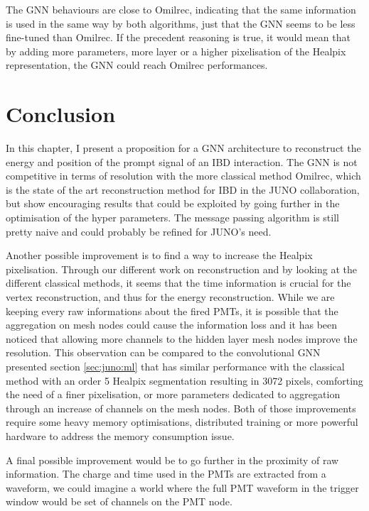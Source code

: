 \documentclass[../main.tex]{subfiles}
\begin{document}
The GNN behaviours are close to Omilrec, indicating that the same information is used in the same way by both algorithms, just that the GNN seems to be less fine-tuned than Omilrec. If the precedent reasoning is true, it would mean that by adding more parameters, more layer or a higher pixelisation of the Healpix representation, the GNN could reach Omilrec performances.



\section{Conclusion}


In this chapter, I present a proposition for a GNN architecture to reconstruct the energy and position of the prompt signal of an IBD interaction. The GNN is not competitive in terms of resolution with the more classical method Omilrec, which is the state of the art reconstruction method for IBD in the JUNO collaboration, but show encouraging results that could be exploited by going further in the optimisation of the hyper parameters. The message passing algorithm is still pretty naive and could probably be refined for JUNO's need.

Another possible improvement is to find a way to increase the Healpix pixelisation. Through our different work on reconstruction and by looking at the different classical methods, it seems that the time information is crucial for the vertex reconstruction, and thus for the energy reconstruction. While we are keeping every raw informations about the fired PMTs, it is possible that the aggregation on mesh nodes could cause the information loss and it has been noticed that allowing more channels to the hidden layer mesh nodes improve the resolution. This observation can be compared to the convolutional GNN presented section \ref{sec:juno:ml} that has similar performance with the classical method with an order 5 Healpix segmentation resulting in 3072 pixels, comforting the need of a finer pixelisation, or more parameters dedicated to aggregation through an increase of channels on the mesh nodes. Both of those improvements require some heavy memory optimisations, distributed training or more powerful hardware to address the memory consumption issue.

A final possible improvement would be to go further in the proximity of raw information. The charge and time used in the PMTs are extracted from a waveform, we could imagine a world where the full PMT waveform in the trigger window would be set of channels on the PMT node.
\end{document}

